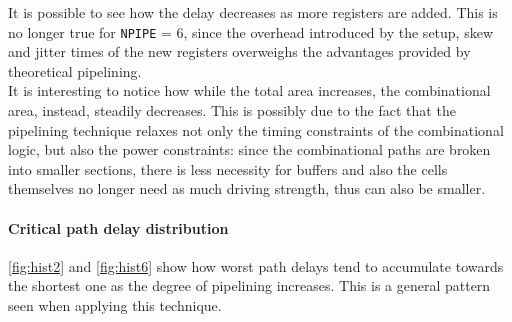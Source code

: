 It is possible to see how the delay decreases as more registers are added. This is no longer true for \texttt{NPIPE} = 6, since the overhead introduced by the setup, skew and jitter times of the new registers overweighs the advantages provided by theoretical pipelining.\\
It is interesting to notice how while the total area increases, the combinational area, instead, steadily decreases. This is possibly due to the fact that the pipelining technique relaxes not only the timing constraints of the combinational logic, but also the power constraints: since the combinational paths are broken into smaller sections, there is less necessity for buffers and also the cells themselves no longer need as much driving strength, thus can also be smaller.


\paragraph{Critical path delay distribution}
\autoref{fig:hist2} and \autoref{fig:hist6} show how worst path delays tend to accumulate towards the shortest one as the degree of pipelining increases. This is a general pattern seen when applying this technique.
